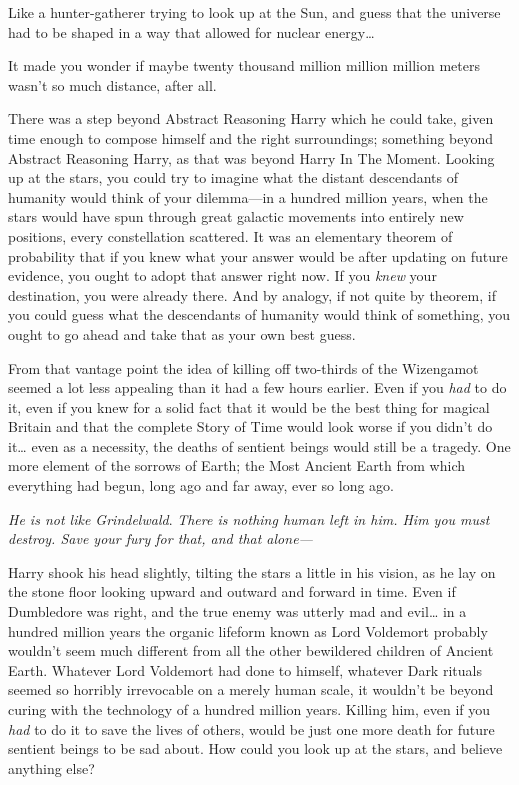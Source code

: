 Like a hunter-gatherer trying to look up at the Sun, and guess that the
universe had to be shaped in a way that allowed for nuclear energy{\ldots}

It made you wonder if maybe twenty thousand million million million meters
wasn't so much distance, after all.

There was a step beyond Abstract Reasoning Harry which he could take, given
time enough to compose himself and the right surroundings; something beyond
Abstract Reasoning Harry, as that was beyond Harry In The Moment. Looking up at
the stars, you could try to imagine what the distant descendants of humanity
would think of your dilemma---in a hundred million years, when the stars would
have spun through great galactic movements into entirely new positions, every
constellation scattered. It was an elementary theorem of probability that if
you knew what your answer would be after updating on future evidence, you ought
to adopt that answer right now. If you \emph{knew} your destination, you were
already there. And by analogy, if not quite by theorem, if you could guess what
the descendants of humanity would think of something, you ought to go ahead and
take that as your own best guess.

From that vantage point the idea of killing off two-thirds of the Wizengamot
seemed a lot less appealing than it had a few hours earlier. Even if you
\emph{had} to do it, even if you knew for a solid fact that it would be the
best thing for magical Britain and that the complete Story of Time would look
worse if you didn't do it{\ldots} even as a necessity, the deaths of sentient
beings would still be a tragedy. One more element of the sorrows of Earth; the
Most Ancient Earth from which everything had begun, long ago and far away, ever
so long ago.

\emph{He is not like Grindelwald}. \emph{There is nothing human left in him.
Him you must destroy. Save your fury for that, and that alone---}

Harry shook his head slightly, tilting the stars a little in his vision, as he
lay on the stone floor looking upward and outward and forward in time. Even if
Dumbledore was right, and the true enemy was utterly mad and evil{\ldots} in a
hundred million years the organic lifeform known as Lord Voldemort probably
wouldn't seem much different from all the other bewildered children of Ancient
Earth. Whatever Lord Voldemort had done to himself, whatever Dark rituals
seemed so horribly irrevocable on a merely human scale, it wouldn't be beyond
curing with the technology of a hundred million years. Killing him, even if you
\emph{had} to do it to save the lives of others, would be just one more death
for future sentient beings to be sad about. How could you look up at the stars,
and believe anything else?

